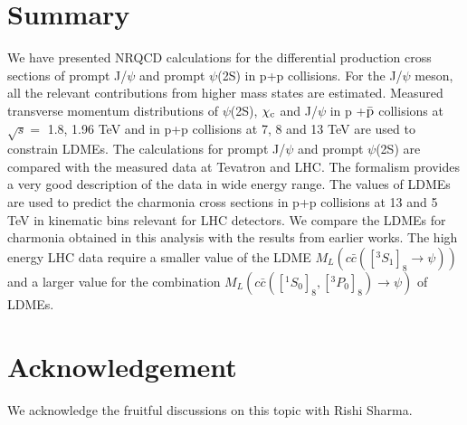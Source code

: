 \documentclass[12pt,a4paper,final]{iopart}
\newcommand{\barc}{{\bar{c}}}
\begin{document}


\section{Summary}
  We have presented NRQCD calculations for the differential production 
cross sections of prompt J/$\psi$ and prompt $\psi$(2S) in  p+p collisions.
For the J/$\psi$ meson, all the relevant contributions from higher mass states 
are estimated. 
 Measured transverse momentum distributions of $\psi$(2S), $\chi_{\rm c}$ and J/$\psi$ 
in p +{$\bar {\rm p}$} collisions at $\sqrt{s}=$ 1.8, 1.96 TeV and in p+p collisions at 
7, 8 and 13 TeV are used to constrain LDMEs. 
 The calculations for  prompt J/$\psi$ and prompt $\psi$(2S) are compared with the measured 
data at Tevatron and LHC. 
  The formalism provides a very good description of the data in wide energy range. 
The values of LDMEs are used to predict the charmonia cross sections in p+p collisions 
at 13 and 5 TeV in kinematic bins relevant for LHC detectors. 
 We compare the LDMEs for charmonia obtained in this analysis with the results from earlier works.
 The high energy LHC data require a smaller value of the LDME $M_{L}(c\barc([^3S_1]_{8}\rightarrow \psi))$ 
and a larger value for the combination  $M_{L}(c\barc([^1S_0]_{8},[^3P_0]_{8})\rightarrow \psi)$ of LDMEs.    

\section*{Acknowledgement}
 We acknowledge the fruitful discussions on this topic with Rishi Sharma.
\end{document}
